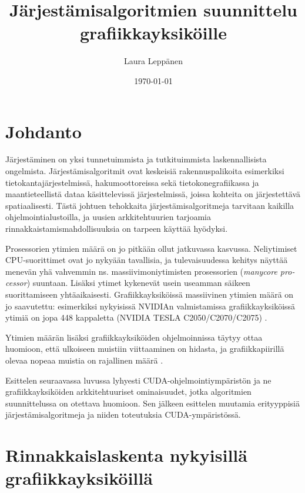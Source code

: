 \documentclass[a4paper,11pt]{article}
\begin{document}
\title{Järjestämisalgoritmien suunnittelu grafiikkayksiköille}
\author{Laura Leppänen}
\date{\today}
\maketitle

\tableofcontents
\onehalfspacing

\newpage

\section{Johdanto}

Järjestäminen on yksi tunnetuimmista ja tutkituimmista laskennallisista ongelmista. Järjestämisalgoritmit ovat keskeisiä rakennuspalikoita esimerkiksi tietokantajärjestelmissä, hakumoottoreissa sekä tietokonegrafiikassa ja maantieteellistä dataa käsittelevissä järjestelmissä, joissa kohteita on järjestettävä spatiaalisesti. Tästä johtuen tehokkaita järjestämisalgoritmeja tarvitaan kaikilla ohjelmointialustoilla, ja uusien arkkitehtuurien tarjoamia rinnakkaistamismahdollisuuksia on tarpeen käyttää hyödyksi.

Prosessorien ytimien määrä on jo pitkään ollut jatkuvassa kasvussa. Neliytimiset CPU-suorittimet ovat jo nykyään tavallisia, ja tulevaisuudessa kehitys näyttää menevän yhä vahvemmin ns. massiivimoniytimisten prosessorien (\emph{\foreignlanguage{english}{manycore processor}}) suuntaan. Lisäksi ytimet kykenevät usein useamman säikeen suorittamiseen yhtäaikaisesti. Grafiikkayksiköissä massiivinen ytimien määrä on jo saavutettu: esimerkiksi nykyisissä NVIDIAn valmistamissa grafiikkayksiköissä ytimiä on jopa 448 kappaletta (NVIDIA TESLA C2050/C2070/C2075) \cite{nvidiafermi2010}.

Ytimien määrän lisäksi grafiikkayksiköiden ohjelmoinnissa täytyy ottaa huomioon, että ulkoiseen muistiin viittaaminen on hidasta, ja grafiikkapiirillä olevaa nopeaa muistia on rajallinen määrä \cite{leischner2010}.

Esittelen seuraavassa luvussa lyhyesti CUDA-ohjelmointiympäristön ja ne grafiikkayksiköiden arkkitehtuuriset ominaisuudet, jotka algoritmien suunnittelussa on otettava huomioon. Sen jälkeen esittelen muutamia erityyppisiä järjestämisalgoritmeja ja niiden toteutuksia CUDA-ympäristössä.

\section{Rinnakkaislaskenta nykyisillä grafiikkayksiköillä}
\end{document}
